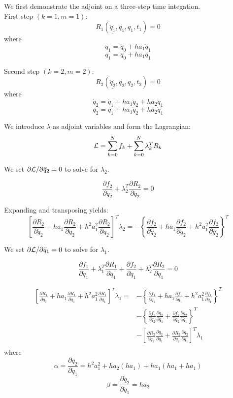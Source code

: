 \documentclass{beamer}
\newcommand{\pd}[2]{\frac{\partial #1}{\partial #2}}
\begin{document}
\begin{frame}[allowframebreaks]
  \framebreak

  We first demonstrate the adjoint on a three-step time integation. \\

  First step $(k=1, m=1)$: $$R_1(\underline{\ddot{q}_1}, \dot{q}_1, q_1, t_1) = 0$$
  where
  $$ \dot{q}_1  = \dot{q}_{0}  + h a_1 \ddot{q}_{1}$$ 
  $$     {q}_1  =     {q}_{0}  + h a_1 \dot{q}_{1}$$ 

  Second step $(k=2, m=2)$: $$R_2(\underline{\ddot{q}_2}, \dot{q}_2, q_2, t_2) = 0$$
  where
  $$ \dot{q}_2  = \dot{q}_{1}  + h a_1 \ddot{q}_{2} + h a_2 \ddot{q}_{1} $$ 
  $$     {q}_2  =     {q}_{1}  + h a_1 \dot{q}_{2}  + h a_2 \dot{q}_{1} $$ 

  We introduce $\lambda$ as adjoint variables and form the Lagrangian: $$ {\cal L} = \sum_{k=0}^N f_k + \sum_{k=0}^N \lambda_k^T R_k $$

  We set $\partial{\cal{L}}/\partial{\ddot{q}_2}=0$ to solve for $\lambda_2$.
  
  $$\pd{f_2}{\ddot{q}_2} + \lambda_2^T \pd{R_2}{\ddot{q}_2} = 0$$

  Expanding and transposing yields:
  $$
  \left[ \pd{R_2}{\ddot{q}_2} + ha_1 \pd{R_2}{\dot{q}_2} + h^2a_1^2 \pd{R_2}{{q}_2} \right]^T \lambda_2 = - \left\{ \pd{f_2}{\ddot{q}_2} + ha_1 \pd{f_2}{\dot{q}_2} + h^2a_1^2 \pd{f_2}{{q}_2} \right\}^T 
  $$
  
  We set $\partial{\cal{L}}/\partial{\ddot{q}_1}=0$ to solve for $\lambda_1$. 
  
  $$\pd{f_1}{\ddot{q}_1} + \lambda_1^T \pd{R_1}{\ddot{q}_1} 
  + \pd{f_2}{\ddot{q}_1} + \lambda_2^T \pd{R_2}{\ddot{q}_1} = 0$$

\begin{equation}\nonumber
\begin{split}
  \left[ \pd{R_1}{\ddot{q}_1} + ha_1 \pd{R_1}{\dot{q}_1} + h^2a_1^2 \pd{R_1}{{q}_1} \right]^T \lambda_1  = &
  - \left\{ \pd{f_1}{\ddot{q}_1} + ha_1 \pd{f_1}{\dot{q}_1} + h^2a_1^2 \pd{f_1}{{q}_1} \right\}^T \\
  & - \left\{ \pd{f_2}{\dot{q}_2} \pd{\dot{q}_2}{\ddot{q}_1} +  \pd{f_2}{{q}_2} \pd{{q}_2}{\ddot{q}_1} \right\}^T\\
  & - \left[  \pd{R_2}{\dot{q}_2} \pd{\dot{q}_2}{\ddot{q}_1} +  \pd{R_2}{{q}_2} \pd{{q}_2}{\ddot{q}_1} \right]^T \lambda_1 \\
\end{split}
\end{equation}
where
$$\alpha=\pd{q_2}{\ddot{q}_1} = h^2a_1^2 + ha_2(ha_1) + ha_1(ha_1+ha_1)$$
$$
\beta=\pd{\dot{q}_2}{\ddot{q}_1} = ha_2
$$
\end{frame}
\end{document}

